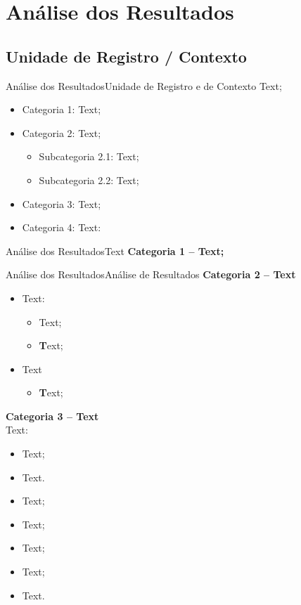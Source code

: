 \documentclass[8pt,aspectratio = 1610]{beamer}
\begin{document}
\section{Análise dos Resultados}
\subsection{Unidade de Registro / Contexto}
\begin{frame}{Análise dos Resultados}{Unidade de Registro e de Contexto}
Text;
\begin{itemize}
    \item Categoria 1: Text;
    \item Categoria 2: Text;
    \begin{itemize}
        \item Subcategoria 2.1: Text;
        \item Subcategoria 2.2: Text;
    \end{itemize}
    \item Categoria 3: Text;
    \item Categoria 4: Text:
    
\end{itemize}
\end{frame}

\begin{frame}{Análise dos Resultados}{Text}
 \textbf{Categoria 1 – Text;}

\end{frame}

\begin{frame}{Análise dos Resultados}{Análise de Resultados}
\textbf{Categoria 2 – Text}
     \begin{itemize}
        \item Text:
        \begin{itemize}
            \item Text;
            \item \textbf
 Text;
        \end{itemize}
        \item Text
        \begin{itemize}
            \item \textbf Text;
        \end{itemize}
     \end{itemize}

\textbf{Categoria 3 – Text}\\
\vspace{5pt}
Text:
\begin{itemize}
    \item Text;
    \item Text.
    \item Text;
    \item Text;
    \item Text; 
    \item Text;
    \item Text.
\end{itemize}
\end{frame}
\end{document}
